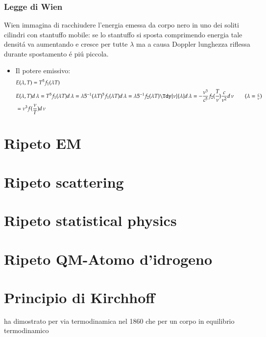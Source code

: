                 \section{Legge di Wien}
                Wien immagina di racchiudere l'energia emessa da corpo nero in uno dei soliti cilindri con stantuffo mobile: se lo stantuffo si sposta comprimendo energia tale densit\'a va aumentando e cresce per tutte $\lambda$ ma a causa Doppler lunghezza riflessa durante spostamento \'e pi\'u piccola.
                \begin{itemize}
                    \item Il potere emissivo:
                        \begin{align*}
                            &E(\lambda,T)=T^5f_1(\lambda T)\\
                            &E(\lambda,T)d\,\lambda=T^5f_1(\lambda T)d\,\lambda=\lambda\invers{5}(\lambda T)^5f_1(\lambda T)d\,\lambda=\lambda\invers{5}f_2(\lambda T)\Tdy{\nu}{\lambda}d\,\lambda=-\frac{\nu^5}{c^5}f_2(\cfrac{T}{\nu})\frac{c}{\nu^2}d\,\nu\tag{$\lambda=\frac{c}{\nu}$}\\
                            &=\nu^3f(\frac{\nu}{T})d\,\nu
                        \end{align*}
                \end{itemize}
\part{Ripeto EM}

\part{Ripeto scattering}

\part{Ripeto statistical physics}

\part{Ripeto QM-Atomo d'idrogeno}

\part{Principio di Kirchhoff}
     \khhff{} ha dimostrato per via termodinamica nel 1860 che per un corpo in equilibrio termodinamico
%
